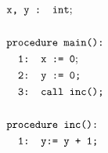 \documentclass{article}
\begin{document}
	\begin{minipage}{.3\textwidth}
		\centering
		\begin{align*}
		&\texttt{x, y : int}; \\ \\
		&\texttt{procedure main():} \\
		&\texttt{\hspace*{1em}1:  x := 0}; \\
		&\texttt{\hspace*{1em}2:  y := 0;} \\
		&\texttt{\hspace*{1em}3: call inc();} \\ \\
		&\texttt{procedure inc():} \\
		&\texttt{\hspace*{1em}1: y:= y\ +\ 1;} \\
		\end{align*}
		
		\label{fig:square}
	\end{minipage}%
	\hfill
\end{document}
